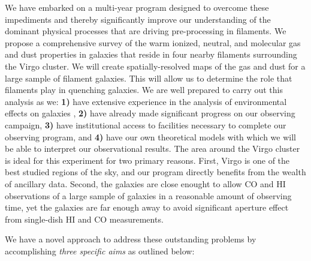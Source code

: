 \documentclass[11pt, preprint]{aastex}
\begin{document}

 We have embarked on a multi-year program designed to overcome these
 impediments and thereby significantly improve our understanding of the dominant physical processes that are driving
  pre-processing in filaments.  
We propose a
comprehensive survey of the warm ionized, neutral, and
molecular gas and dust properties in galaxies that reside in four nearby
filaments surrounding the Virgo cluster.  We will
create spatially-resolved maps of the gas and dust for a large sample
of filament galaxies.  %
This will allow us to determine the
role that filaments play in quenching galaxies.  We are well prepared to carry
out this analysis as we: \textbf{1)} have extensive experience in the
analysis of environmental effects on galaxies \citep{Poggianti06, Desai07a,Rudnick09, Finn10, Cantale16},
\textbf{2)} have already made significant progress on our observing
campaign, 
\textbf{3)} have institutional access to
facilities necessary to complete our observing program, and
\textbf{4)} have our own theoretical models with which we will be able
to interpret our observational results.  The area around the Virgo
cluster is ideal for this experiment for two primary reasons.  First,
Virgo is one of the best studied regions of the sky, and our program
directly benefits from the wealth of ancillary data.  Second, the
galaxies are close enought to allow CO and HI observations of a large
sample of galaxies in a reasonable amount of observing time, yet the galaxies are far enough away to avoid significant aperture effect from single-dish HI and CO measurements.

We have a novel approach to address these outstanding problems by
accomplishing {\it three specific aims} as outlined below: 
\end{document}
